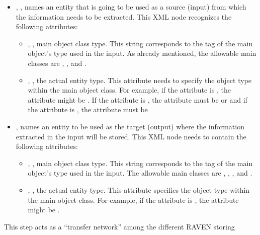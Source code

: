 \begin{itemize}
\item {}, , names an entity
  that is going to be used as a source (input) from which the information needs
  to be extracted.
  This XML node recognizes the following attributes:
\begin{itemize}
  \item {}, , main object class
    type.
    This string corresponds to the tag of the main object's type used in the
    input.
    As already mentioned, the allowable main classes are ,
    ,  and .
  \item {}, , the actual entity
    type.
    This attribute needs to specify the object type within the main object
    class.
    For example, if the   attribute is , the
     attribute might be . If the   attribute is , the
     attribute must be  or  and if the   attribute is , the
     attribute must be \xmlString{ }
\end{itemize}
\item {},  names an entity to
  be used as the target (output) where the information extracted in the input
  will be stored.
  This XML node needs to contain the following attributes:
\begin{itemize}
  \item {}, , main object class
    type.
    This string corresponds to the tag of the main object's type used in the
    input.
    The allowable main classes are , , ,  and .
  \item {}, , the actual entity
    type.
    This attribute specifies the object type within the main object class.
    For example, if the  attribute is
    , the  attribute might be
    .
\end{itemize}
\end{itemize}
This step acts as a ``transfer network'' among the different RAVEN storing
